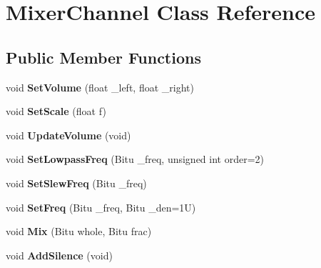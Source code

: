 \hypertarget{classMixerChannel}{\section{Mixer\-Channel Class Reference}
\label{classMixerChannel}
}
\subsection*{Public Member Functions}
\begin{DoxyCompactItemize}
\item 
\hypertarget{classMixerChannel_a547da19129e9690e9af67178189562cf}{void {\bfseries Set\-Volume} (float \-\_\-left, float \-\_\-right)}\label{classMixerChannel_a547da19129e9690e9af67178189562cf}

\item 
\hypertarget{classMixerChannel_ab36f75e5005f67da923efc8ba8b7f2e2}{void {\bfseries Set\-Scale} (float f)}\label{classMixerChannel_ab36f75e5005f67da923efc8ba8b7f2e2}

\item 
\hypertarget{classMixerChannel_ac33a5acf44812b9ba4706960b2067552}{void {\bfseries Update\-Volume} (void)}\label{classMixerChannel_ac33a5acf44812b9ba4706960b2067552}

\item 
\hypertarget{classMixerChannel_a7d752500c09917c50e87f30ce76f19ba}{void {\bfseries Set\-Lowpass\-Freq} (Bitu \-\_\-freq, unsigned int order=2)}\label{classMixerChannel_a7d752500c09917c50e87f30ce76f19ba}

\item 
\hypertarget{classMixerChannel_a3de9c959c7e9d68838ef69f44602ffb8}{void {\bfseries Set\-Slew\-Freq} (Bitu \-\_\-freq)}\label{classMixerChannel_a3de9c959c7e9d68838ef69f44602ffb8}

\item 
\hypertarget{classMixerChannel_ac9960e9c8e3bde4d0c77ccce9a6de331}{void {\bfseries Set\-Freq} (Bitu \-\_\-freq, Bitu \-\_\-den=1\-U)}\label{classMixerChannel_ac9960e9c8e3bde4d0c77ccce9a6de331}

\item 
\hypertarget{classMixerChannel_aada1c5055048850708366adb5fe925aa}{void {\bfseries Mix} (Bitu whole, Bitu frac)}\label{classMixerChannel_aada1c5055048850708366adb5fe925aa}

\item 
\hypertarget{classMixerChannel_afa28eba1c36e5bc5bcea638d13908ae1}{void {\bfseries Add\-Silence} (void)}\label{classMixerChannel_afa28eba1c36e5bc5bcea638d13908ae1}


\end{DoxyCompactItemize}
